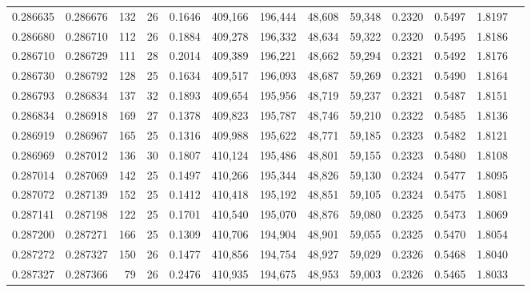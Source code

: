 \begin{tabular}{rrrrrrrrrrrrr}
0.286635 & 0.286676 &   132 &  26 &                                     0.1646 & 409,166 & 196,444 &  48,608 &  59,348 & 0.2320 & 0.5497 & 1.8197 \\
0.286680 & 0.286710 &   112 &  26 &                                     0.1884 & 409,278 & 196,332 &  48,634 &  59,322 & 0.2320 & 0.5495 & 1.8186 \\
0.286710 & 0.286729 &   111 &  28 &                                     0.2014 & 409,389 & 196,221 &  48,662 &  59,294 & 0.2321 & 0.5492 & 1.8176 \\
0.286730 & 0.286792 &   128 &  25 &                                     0.1634 & 409,517 & 196,093 &  48,687 &  59,269 & 0.2321 & 0.5490 & 1.8164 \\
0.286793 & 0.286834 &   137 &  32 &                                     0.1893 & 409,654 & 195,956 &  48,719 &  59,237 & 0.2321 & 0.5487 & 1.8151 \\
0.286834 & 0.286918 &   169 &  27 &                                     0.1378 & 409,823 & 195,787 &  48,746 &  59,210 & 0.2322 & 0.5485 & 1.8136 \\
0.286919 & 0.286967 &   165 &  25 &                                     0.1316 & 409,988 & 195,622 &  48,771 &  59,185 & 0.2323 & 0.5482 & 1.8121 \\
0.286969 & 0.287012 &   136 &  30 &                                     0.1807 & 410,124 & 195,486 &  48,801 &  59,155 & 0.2323 & 0.5480 & 1.8108 \\
0.287014 & 0.287069 &   142 &  25 &                                     0.1497 & 410,266 & 195,344 &  48,826 &  59,130 & 0.2324 & 0.5477 & 1.8095 \\
0.287072 & 0.287139 &   152 &  25 &                                     0.1412 & 410,418 & 195,192 &  48,851 &  59,105 & 0.2324 & 0.5475 & 1.8081 \\
0.287141 & 0.287198 &   122 &  25 &                                     0.1701 & 410,540 & 195,070 &  48,876 &  59,080 & 0.2325 & 0.5473 & 1.8069 \\
0.287200 & 0.287271 &   166 &  25 &                                     0.1309 & 410,706 & 194,904 &  48,901 &  59,055 & 0.2325 & 0.5470 & 1.8054 \\
0.287272 & 0.287327 &   150 &  26 &                                     0.1477 & 410,856 & 194,754 &  48,927 &  59,029 & 0.2326 & 0.5468 & 1.8040 \\
0.287327 & 0.287366 &    79 &  26 &                                     0.2476 & 410,935 & 194,675 &  48,953 &  59,003 & 0.2326 & 0.5465 & 1.8033 \\

\end{tabular}
